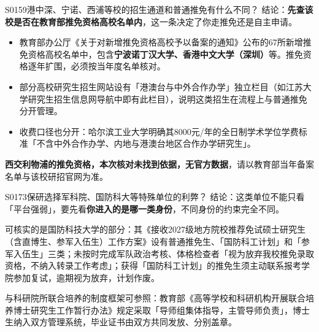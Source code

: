 \begin{qa}{S0159}{港中深、宁诺、西浦等校的招生通道和普通推免有什么不同？}
结论：\textbf{先查该校是否在教育部推免资格高校名单内}，这一条决定了你走推免还是自主申请。

\begin{itemize}
  \item 教育部办公厅《关于对新增推免资格高校予以备案的通知》公布的67所新增推免资格高校名单中，包含\textbf{宁波诺丁汉大学、香港中文大学（深圳）}等。推免资格逐年扩围，必须按当年度名单核对。
  \item 部分高校研究生招生网站设有「港澳台与中外合作办学」独立栏目（如江苏大学研究生招生信息网导航中即有此栏目），说明这类招生在流程上与普通推免分开管理。
  \item 收费口径也分开：哈尔滨工业大学明确其8000元/年的全日制学术学位学费标准「不含中外合作办学、内地与港澳台地区合作办学研究生」。
\end{itemize}

\textbf{西交利物浦的推免资格，本次核对未找到依据，无官方数据}，请以教育部当年备案名单与该校研招官网为准。
\end{qa}

\begin{qa}{S0173}{保研选择军科院、国防科大等特殊单位的利弊？}
结论：这类单位不能只看「平台强弱」，要先看\textbf{你进入的是哪一类身份}，不同身份的约束完全不同。

可核实的是国防科技大学的部分：其《接收2027级地方院校推荐免试硕士研究生（含直博生、参军入伍生）工作方案》设有普通推免生、「国防科工计划」和「参军入伍生」三类；未按时完成军队政治考核、体格检查者「视为放弃我校推免录取资格，不纳入转录工作考虑」；获得「国防科工计划」的推免生须主动联系报考学院参加复试，逾期视为放弃，计划作废。

与科研院所联合培养的制度框架可参照：教育部《高等学校和科研机构开展联合培养博士研究生工作暂行办法》规定采取「导师组集体指导，主管导师负责」，博士生纳入双方管理系统，毕业证书由双方共同发放、分别盖章。
\end{qa}

